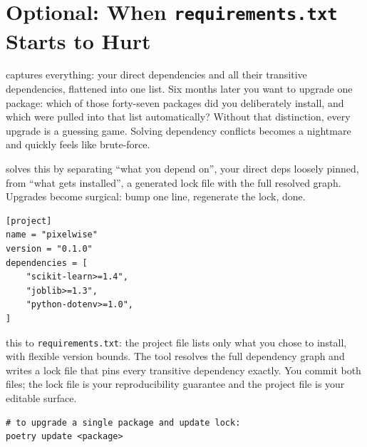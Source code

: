 \newpage
\section{Optional: When \texttt{requirements.txt} Starts to Hurt}

 captures everything:
your direct dependencies and all their transitive
dependencies, flattened into one list.
Six months later you want to upgrade one package: which of those forty-seven
packages did you deliberately install, and which were pulled into that list automatically?
Without that distinction, every upgrade is a guessing game. Solving dependency 
conflicts becomes a nightmare and quickly feels like brute-force.


 solves this by separating
``what you depend on'', your direct deps loosely pinned,
from ``what gets installed'', a generated lock file with the full resolved graph.
Upgrades become surgical: bump one line, regenerate the lock, done.

\begin{verbatim}
[project]
name = "pixelwise"
version = "0.1.0"
dependencies = [
    "scikit-learn>=1.4",
    "joblib>=1.3",
    "python-dotenv>=1.0",
]
\end{verbatim}

 this to \texttt{requirements.txt}: the project file
lists only what you chose to install, with flexible version bounds.
The tool resolves the full dependency graph and writes a lock file that
pins every transitive dependency exactly.
You commit both files; the lock file is your reproducibility guarantee
and the project file is your editable surface.

\begin{verbatim}
# to upgrade a single package and update lock:
poetry update <package>
\end{verbatim}

